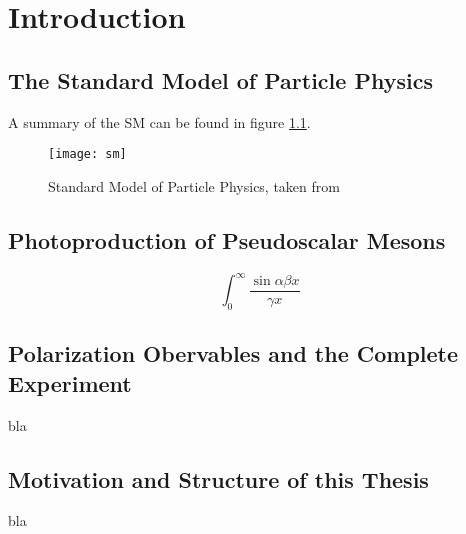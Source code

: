 
\chapter{Introduction}
\label{sec:intro}
\section{The Standard Model of Particle Physics}
A summary of the SM can be found in figure \ref{fig:sm}. 

\begin{figure}[htbp]
	\centering
	\texttt{[image: sm]}
	\caption{Standard Model of Particle Physics, taken from \cite{sm}}
	\label{fig:sm}
\end{figure}
\section{Photoproduction of Pseudoscalar Mesons}
$$\int_0^\infty\frac{\sin \alpha\beta x}{\gamma x}$$
\section{Polarization Obervables and the Complete Experiment}
bla
\section{Motivation and Structure of this Thesis}
bla